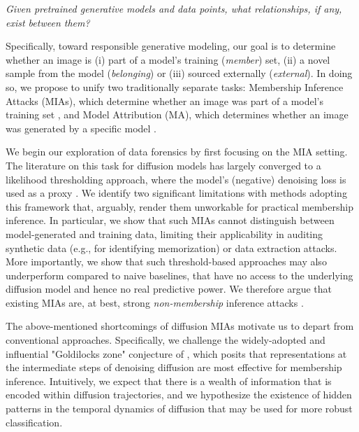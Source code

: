 \documentclass{article}
\theoremstyle{remark}
\begin{document}
\begin{center}
    \textit{Given pretrained generative models and data points, what relationships, if any, exist between them?}
\end{center}

Specifically, toward responsible generative modeling, our goal is to determine whether an image is (i) part of a model’s training (\textit{member}) set, (ii) a novel sample from the model (\textit{belonging}) or (iii) sourced externally (\textit{external}). In doing so, we propose to unify two traditionally separate tasks: Membership Inference Attacks (MIAs), which determine whether an image was part of a model’s training set \citep{7958568, 8429311}, and Model Attribution (MA), which determines whether an image was generated by a specific model \citep{wang2023where, pmlr-v235-laszkiewicz24a}.

\pagebreak

We begin our exploration of data forensics by first focusing on the MIA setting. The literature on this task for diffusion models has largely converged to a likelihood thresholding approach, where the model's (negative) denoising loss is used as a proxy \citep{10188618, 10.5555/3618408.3618757}. We identify two significant limitations with methods adopting this framework that, arguably, render them unworkable for practical membership inference. In particular, we show that such MIAs cannot distinguish between model-generated and training data, limiting their applicability in auditing synthetic data (e.g., for identifying memorization) or data extraction attacks. More importantly, we show that such threshold-based approaches may also underperform compared to naive baselines, that have no access to the underlying diffusion model and hence no real predictive power. We therefore argue that existing MIAs are, at best, strong \textit{non-membership} inference attacks \citep{carlini2022firstprinciples}.

The above-mentioned shortcomings of diffusion MIAs motivate us to depart from conventional approaches. Specifically, we challenge the widely-adopted and influential "Goldilocks zone" conjecture of \citet{10.5555/3620237.3620531}, which posits that representations at the intermediate steps of denoising diffusion are most effective for membership inference. Intuitively, we expect that there is a wealth of information that is encoded within diffusion trajectories, and we hypothesize the existence of hidden patterns in the temporal dynamics of diffusion that may be used for more robust classification.
\end{document}
